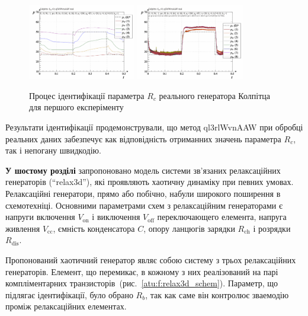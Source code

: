 \documentclass[a4paper,13pt]{atuaref}
\newcommand{\Tidx}[1]{%
  _\mathrm{#1}
}
\begin{document}
\begin{figure}[htb!]
  \centerline{
    \includegraphics[width=0.42\textwidth]{p6/p/r/colp_real_id-p_t_pi_ql3rlWvnAAW_real_d_0.png}
    \hfill
    \includegraphics[width=0.42\textwidth]{p6/p/r/colp_real_id-p_t_p_ql3rlWvnAAW_real_d_0.png}
  }
  \caption{Процес ідентифікації параметра $R_c$ реального генератора Колпітца для першого експеріменту}
  \label{atu:f:colp_r_id_1}
\end{figure}

Результати ідентифікації продемонстрували, що метод ql3rlWvnAAW
при обробці реальних даних забезпечує как відповідність отриманних значень параметра $R_c$,
так і непогану швидкодію.



\textbf{У шостому розділі}
запропоновано модель
системи зв'язаних релаксаційних генераторів (``relax3d''),
які проявляють хаотичну динаміку при певних умовах.
Релаксаційні генератори, прямо або побічно, набули широкого поширення в схемотехніці.
Основними параметрами схем з релаксаційним генераторами є напруги включення
$ V\Tidx{on} $ і виключення $ V \Tidx{off} $ переключающего елемента,
напруга живлення $ V\Tidx{cc} $, ємність конденсатора $C$, опору ланцюгів
зарядки $ R\Tidx{ch} $ і розрядки $ R\Tidx {dis} $.

Пропонований хаотичний генератор являє собою систему з трьох релаксаційних
генераторів. Елемент, що перемикає, в кожному з них реалізований на парі
компліментарних транзисторів~(рис.~\ref{atu:f:relax3d_schem}).
Параметр, що підлягає ідентифікації, було обрано $R_b$,
так как саме він контролює зваемодію проміж релаксаційних елементах.

\end{document}
